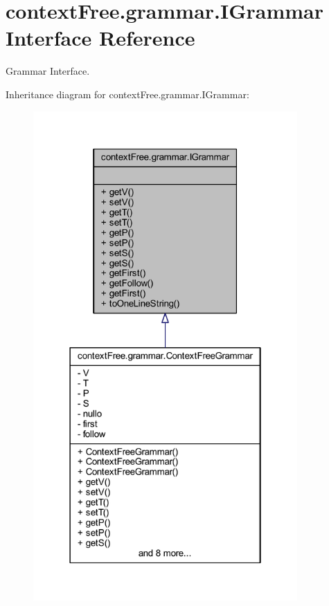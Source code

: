 \hypertarget{interfacecontext_free_1_1grammar_1_1_i_grammar}{\section{context\-Free.\-grammar.\-I\-Grammar Interface Reference}
\label{interfacecontext_free_1_1grammar_1_1_i_grammar}
}


Grammar Interface.  




Inheritance diagram for context\-Free.\-grammar.\-I\-Grammar\-:\nopagebreak
\begin{figure}[H]
\begin{center}
\leavevmode
\includegraphics[width=286pt]{interfacecontext_free_1_1grammar_1_1_i_grammar__inherit__graph}
\end{center}
\end{figure}
